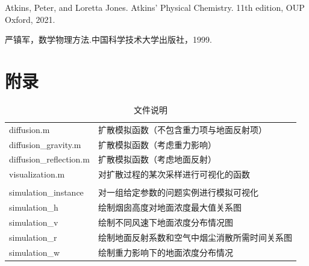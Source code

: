 \documentclass{article}
\begin{document}
	\clearpage
	
	
	\begin{thebibliography}{4}
		\item Atkins, Peter, and Loretta Jones. Atkins' Physical Chemistry. 11th edition, OUP Oxford, 2021.\\
		\item 严镇军，数学物理方法.中国科学技术大学出版社，1999.
	\end{thebibliography}
	
	\section*{附录}
	\begin{table}[htbp]
		\centering
		\begin{tabular}{ll}
			diffusion.m & 扩散模拟函数（不包含重力项与地面反射项）\\
			diffusion\_gravity.m & 扩散模拟函数（考虑重力影响）\\
			diffusion\_reflection.m & 扩散模拟函数（考虑地面反射）\\
			visualization.m & 对扩散过程的某次采样进行可视化的函数\\
			& \\
			simulation\_instance & 对一组给定参数的问题实例进行模拟可视化\\
			simulation\_h & 绘制烟囱高度对地面浓度最大值关系图\\
			simulation\_v & 绘制不同风速下地面浓度分布情况图\\
			simulation\_r & 绘制地面反射系数和空气中烟尘消散所需时间关系图\\
			simulation\_w & 绘制重力影响下的地面浓度分布情况\\
		\end{tabular}
		\caption{文件说明}
	\end{table}
	
\end{document}
